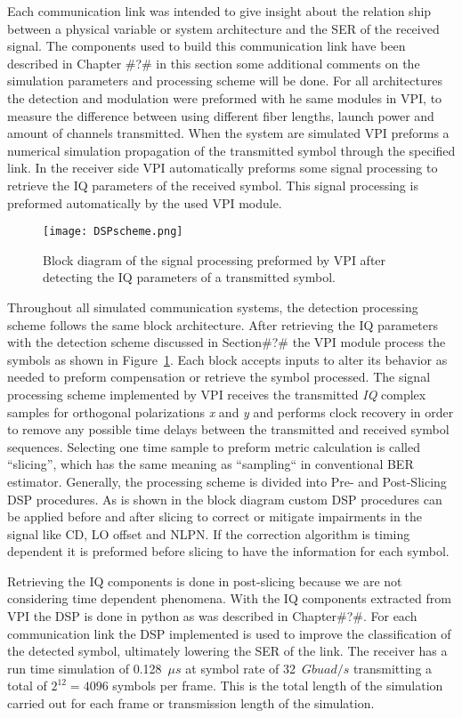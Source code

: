 Each communication link was intended to give insight about the relation ship between a physical variable or system architecture and the SER of the received signal. The components used to build this communication link have been described in Chapter \#?\# in this section some additional comments on the simulation parameters and processing scheme will be done. For all architectures the detection and modulation were preformed with he same modules in VPI, to measure the difference between using different fiber lengths, launch power and amount of channels transmitted. When the system are simulated VPI preforms a numerical simulation propagation of the transmitted symbol through the specified link. In the receiver side VPI automatically preforms some signal processing to retrieve the IQ parameters of the received symbol. This signal processing is preformed automatically by the used VPI module.      
 	



\begin{figure}[h!]
\centering
\texttt{[image: DSPscheme.png]}
\caption{Block diagram of the signal processing preformed by VPI after detecting the IQ parameters of a transmitted symbol. }
\label{fig:dspvpi}
\end{figure}


Throughout all simulated communication systems, the detection processing scheme follows the same block architecture. After retrieving the IQ parameters with the detection scheme discussed in Section\#?\# the VPI module process the symbols as shown in Figure~\ref{fig:dspvpi}. Each block accepts inputs to alter its behavior as needed to preform compensation or retrieve the symbol processed. The signal processing scheme implemented by VPI receives the transmitted \emph{IQ} complex samples for orthogonal polarizations \emph{x} and \emph{y} and performs clock recovery in order to remove any possible time delays between the transmitted and received symbol sequences. Selecting one time sample to preform metric calculation is called “slicing”, which has the same meaning as “sampling“ in conventional BER estimator.  Generally, the processing scheme is divided into  Pre- and Post-Slicing DSP procedures. As is shown in the block diagram custom DSP procedures can be applied before and after slicing to correct or mitigate impairments in the signal like CD, LO offset and NLPN. If the correction algorithm is timing dependent it is preformed before slicing to have the information for each symbol. 


Retrieving the IQ components is done in post-slicing because we are not considering time dependent phenomena. With the IQ components extracted from VPI the DSP is done in python as was described in Chapter\#?\#. For each communication link the DSP implemented is used to improve the classification of the detected symbol, ultimately lowering the SER of the link. The receiver has a run time simulation of 0.128~$\mu s$ at symbol rate of 32~$Gbuad/s$ transmitting a total of $2^{12}=4096$ symbols per frame. This is the total length of the simulation carried out for each frame or transmission length of the simulation.



